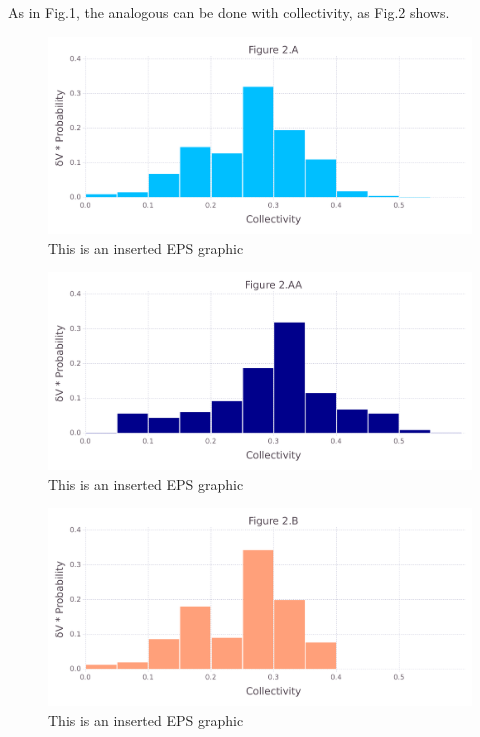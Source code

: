 \documentclass[10pt,letterpaper]{article}
\begin{document}
\clearpage
As in Fig.1, the analogous can be done with collectivity, as Fig.2 shows.

\begin{figure}[ht]
\begin{center}
\includegraphics[scale=0.5]{256l/2afigure_very_hi-precision.pdf}
\caption{This is an inserted EPS graphic}
\label{fig3}
\end{center}
\end{figure}

\begin{figure}[ht]
\begin{center}
\includegraphics[scale=0.5]{256l/2aafigure_very_hi-precision.pdf}
\caption{This is an inserted EPS graphic}
\label{fig4}
\end{center}
\end{figure}

\begin{figure}[ht]
\begin{center}
\includegraphics[scale=0.5]{256l/2bfigure_very_hi-precision.pdf}
\caption{This is an inserted EPS graphic}
\label{fig5}
\end{center}
\end{figure}
\end{document}
